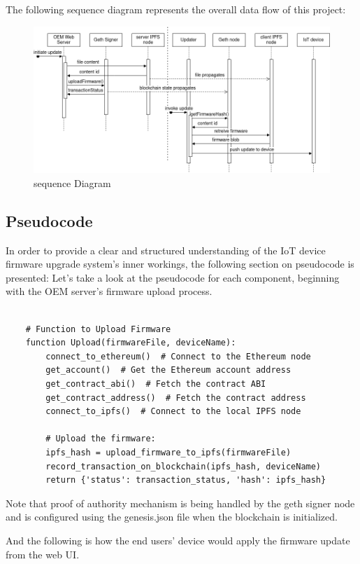 \documentclass{article}
\begin{document}
The following sequence diagram represents the overall data flow of this project:
\begin{figure}[H]
    \centering
    \includegraphics[width=\textwidth]{sequenceDiagram.png}
    \caption{sequence Diagram}
\end{figure}

\subsection{Pseudocode}
In order to provide a clear and structured understanding of the IoT device firmware upgrade system's inner workings, the following section on pseudocode is presented:
Let's take a look at the pseudocode for each component, beginning with the OEM server's firmware upload process.

\begin{lstlisting}
    
    # Function to Upload Firmware
    function Upload(firmwareFile, deviceName):
        connect_to_ethereum()  # Connect to the Ethereum node
        get_account()  # Get the Ethereum account address
        get_contract_abi()  # Fetch the contract ABI
        get_contract_address()  # Fetch the contract address
        connect_to_ipfs()  # Connect to the local IPFS node
    
        # Upload the firmware:
        ipfs_hash = upload_firmware_to_ipfs(firmwareFile)
        record_transaction_on_blockchain(ipfs_hash, deviceName)
        return {'status': transaction_status, 'hash': ipfs_hash}
\end{lstlisting}

Note that proof of authority mechanism is being handled by the geth signer node and is configured using the genesis.json file when the blockchain is initialized.

And the following is how the end users' device would apply the firmware update from the web UI.
\end{document}
